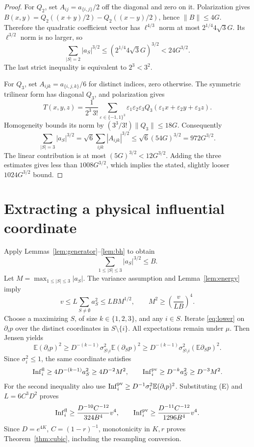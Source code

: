 \documentclass[11pt]{article}
\newcommand{\E}{\mathbb E}
\newcommand{\Inf}{\operatorname{Inf}}
\begin{document}
\begin{proof}
For $Q_2$, set $A_{ij}=a_{\{i,j\}}/2$ off the diagonal and zero
on it. Polarization gives
$B(x,y)=Q_2((x+y)/2)-Q_2((x-y)/2)$, hence $\|B\|\le4G$.
Therefore the quadratic coefficient vector has $\ell^{4/3}$ norm
at most $2^{1/4}4\sqrt3G$. Its $\ell^{3/2}$ norm is no larger, so
\[
 \sum_{|S|=2}|a_S|^{3/2}
 \le(2^{1/4}4\sqrt3G)^{3/2}<24G^{3/2}.
\]
The last strict inequality is equivalent to $2^3<3^2$.

For $Q_3$, set $A_{ijk}=a_{\{i,j,k\}}/6$ for distinct indices,
zero otherwise. The symmetric trilinear form has diagonal $Q_3$,
and polarization gives
\[
 T(x,y,z)=\frac1{2^3\,3!}
 \sum_{\varepsilon\in\{-1,1\}^3}
 \varepsilon_1\varepsilon_2\varepsilon_3
 Q_3(\varepsilon_1x+\varepsilon_2y+\varepsilon_3z).
\]
Homogeneity bounds its norm by $(3^3/3!)\|Q_3\|\le18G$.
Consequently
\[
 \sum_{|S|=3}|a_S|^{3/2}
 =\sqrt6\sum_{ijk}|A_{ijk}|^{3/2}
 \le\sqrt6(54G)^{3/2}=972G^{3/2}.
\]
The linear contribution is at most $(5G)^{3/2}<12G^{3/2}$.
Adding the three estimates gives less than $1008G^{3/2}$, which
implies the stated, slightly looser $1024G^{3/2}$ bound.
\end{proof}

\section{Extracting a physical influential coordinate}

Apply Lemmas~\ref{lem:generator}--\ref{lem:bh} to obtain
\[
 \sum_{1\le|S|\le3}|a_S|^{3/2}\le B.
\]
Let $M=\max_{1\le|S|\le3}|a_S|$. The variance assumption and
Lemma~\ref{lem:energy} imply
\[
 v\le L\sum_{S\ne\emptyset}a_S^2
 \le LB M^{1/2},\qquad
 M^2\ge\left(\frac{v}{LB}\right)^4.\tag{E}
\]
Choose a maximizing $S$, of size $k\in\{1,2,3\}$, and any $i\in S$.
Iterate \eqref{eq:lower} on $\partial_i p$ over the distinct
coordinates in $S\setminus\{i\}$. All expectations remain under $\mu$.
Then Jensen yields
\[
 \E(\partial_i p)^2
 \ge D^{-(k-1)}\sigma_{S\setminus i}^2\E(\partial_Sp)^2
 \ge D^{-(k-1)}\sigma_{S\setminus i}^2(\E\partial_Sp)^2.
\]
Since $\sigma_i^2\le1$, the same coordinate satisfies
\[
 \Inf_i^{\rm fl}\ge4D^{-(k-1)}a_S^2\ge4D^{-2}M^2,
 \qquad
 \Inf_i^{\rm pv}\ge D^{-k}a_S^2\ge D^{-3}M^2.
\]
For the second inequality also use
$\Inf_i^{\rm pv}\ge D^{-1}\sigma_i^2\E(\partial_i p)^2$.
Substituting (E) and $L=6C^3D^2$ proves
\[
 \Inf_i^{\rm fl}\ge\frac{D^{-10}C^{-12}}{324B^4}v^4,
 \qquad \Inf_i^{\rm pv}\ge\frac{D^{-11}C^{-12}}{1296B^4}v^4.
\]
Since $D=e^{4K}$, $C=(1-r)^{-1}$, monotonicity in $K,r$ proves
Theorem~\ref{thm:cubic}, including the resampling conversion.
\end{document}

